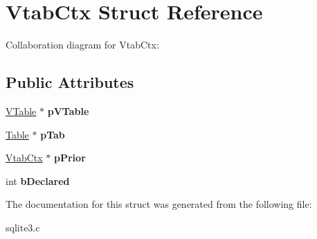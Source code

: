 \hypertarget{structVtabCtx}{}\section{Vtab\+Ctx Struct Reference}
\label{structVtabCtx}


Collaboration diagram for Vtab\+Ctx\+:
\subsection*{Public Attributes}
\begin{DoxyCompactItemize}
\item 
\hyperlink{structVTable}{V\+Table} $\ast$ {\bfseries p\+V\+Table}\hypertarget{structVtabCtx_a99bbe533ea0423138d7dddba5aa662b8}{}\label{structVtabCtx_a99bbe533ea0423138d7dddba5aa662b8}

\item 
\hyperlink{structTable}{Table} $\ast$ {\bfseries p\+Tab}\hypertarget{structVtabCtx_a4040cb18a83afebad0ad7e7f20572b09}{}\label{structVtabCtx_a4040cb18a83afebad0ad7e7f20572b09}

\item 
\hyperlink{structVtabCtx}{Vtab\+Ctx} $\ast$ {\bfseries p\+Prior}\hypertarget{structVtabCtx_a0100b21d6b04d3b7565f1315b9008385}{}\label{structVtabCtx_a0100b21d6b04d3b7565f1315b9008385}

\item 
int {\bfseries b\+Declared}\hypertarget{structVtabCtx_a3e4936f41e9dc9a8ee37f35b9aec90d8}{}\label{structVtabCtx_a3e4936f41e9dc9a8ee37f35b9aec90d8}

\end{DoxyCompactItemize}


The documentation for this struct was generated from the following file\+:\begin{DoxyCompactItemize}
\item 
sqlite3.\+c\end{DoxyCompactItemize}
